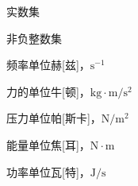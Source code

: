 %
%
%

\begin{denotation}
\item[$\mathbb{R}$] 实数集
\item[$\mathbb{N}$] 非负整数集
\item[Hz] 频率单位赫[兹]，$\mathrm{s}^{-1}$
\item[N] 力的单位牛[顿]，$\mathrm{kg}\cdot\mathrm{m}/\mathrm{s}^{2}$
\item[Pa] 压力单位帕[斯卡]，$\mathrm{N}/\mathrm{m}^{2}$
\item[J] 能量单位焦[耳]，$\mathrm{N}\cdot\mathrm{m}$
\item[W] 功率单位瓦[特]，$\mathrm{J}/\mathrm{s}$
\end{denotation}
